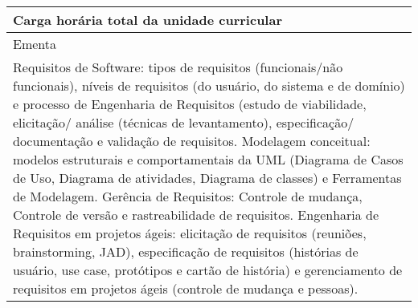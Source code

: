 \begin{quadro}[h!]
\begin{tabular}{|p{3cm} p{2cm} p{3cm} p{2cm} p{3cm} p{2cm}|}
\multicolumn{5}{|p{13cm}|}{\cellcolor{blue1} Carga horária total da unidade curricular} & \multicolumn{1}{p{1cm}|}{\raggedleft 60	}\\\hline
\multicolumn{6}{|p{15cm}|}{\cellcolor{blue1} Ementa} \\\hline
\hline\multicolumn{6}{|p{15cm}|}{\scriptsize Requisitos de Software: tipos de requisitos (funcionais/não funcionais), níveis de requisitos (do usuário, do sistema e de domínio) e processo de Engenharia de Requisitos (estudo de viabilidade, elicitação/ análise (técnicas de levantamento), especificação/ documentação e validação de requisitos. Modelagem conceitual: modelos estruturais e comportamentais da UML (Diagrama de Casos de Uso, Diagrama de atividades, Diagrama de classes) e Ferramentas de Modelagem. Gerência de Requisitos: Controle de mudança, Controle de versão e rastreabilidade de requisitos. Engenharia de Requisitos em projetos ágeis: elicitação de requisitos (reuniões, brainstorming, JAD), especificação de requisitos (histórias de usuário, use case, protótipos e cartão de história) e gerenciamento de requisitos em projetos ágeis (controle de mudança e pessoas).}\\\hline
\hline
	\end{tabular}
\end{quadro}
